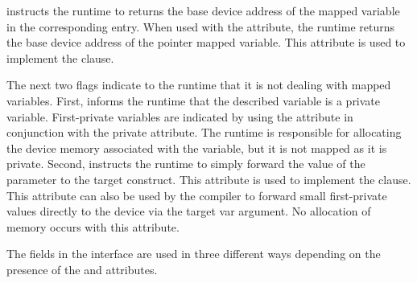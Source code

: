  instructs the runtime to returns the base device address of the mapped variable in the corresponding  entry. When used with  the  attribute, the runtime returns the base device address of the pointer mapped variable. This attribute is used to implement the  clause.

The next two flags indicate to the runtime that it is not dealing with mapped variables.  First,  informs the runtime that the described variable is a private variable. First-private variables are indicated by using the    attribute in conjunction with the private attribute. The runtime is responsible for allocating the device memory associated with the variable, but it is not mapped as it is private. Second,  instructs the runtime to simply forward the value of the  parameter to the target construct.  This attribute is used to implement the  clause. This attribute can also be used by the compiler to forward small first-private values directly to the device via the target var argument. No allocation of memory occurs with this attribute.

The fields in the interface are used in three different ways depending on the presence of the  and  attributes.

